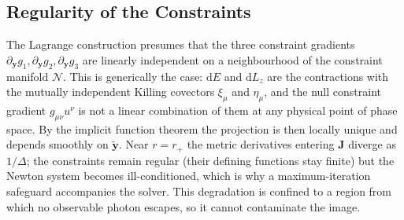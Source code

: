\documentclass[11pt]{book}
\begin{document}
\subsection{Regularity of the Constraints}
The Lagrange construction presumes that the three constraint gradients
 $\partial_{\bm{y}} g_1, \partial_{\bm{y}} g_2, \partial_{\bm{y}} g_3$ are linearly
independent on a neighbourhood of the constraint manifold $\mathcal{N}$. This is
generically the case: $\mathrm{d}E$ and $\mathrm{d}L_z$ are the contractions with the
mutually independent Killing covectors $\xi_\mu$ and $\eta_\mu$, and the null
constraint gradient $g_{\mu\nu}u^\nu$ is not a linear combination of them at any
physical point of phase space. By the implicit function theorem the projection is then
locally unique and depends smoothly on $\tilde{\bm{y}}$. Near $r = r_+$ the metric
derivatives entering $\bm{J}$ diverge as $1/\Delta$; the constraints remain regular
(their defining functions stay finite) but the Newton system becomes
ill-conditioned, which is why a maximum-iteration safeguard accompanies the solver.
This degradation is confined to a region from which no observable photon escapes, so it cannot contaminate the image.
\end{document}
